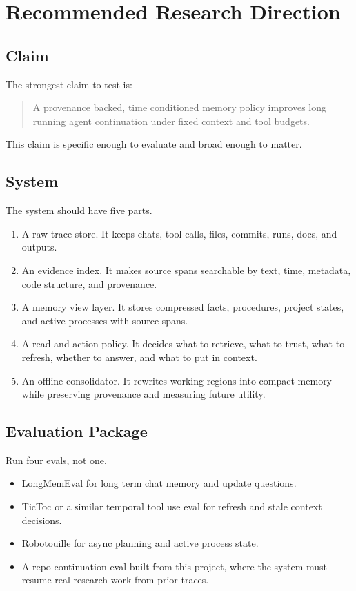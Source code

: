 \documentclass[11pt]{article}
\begin{document}
\section{Recommended Research Direction}

\subsection{Claim}

The strongest claim to test is:

\begin{quote}
A provenance backed, time conditioned memory policy improves long running agent continuation under fixed context and tool budgets.
\end{quote}

This claim is specific enough to evaluate and broad enough to matter.

\subsection{System}

The system should have five parts.

\begin{enumerate}
  \item A raw trace store. It keeps chats, tool calls, files, commits, runs, docs, and outputs.
  \item An evidence index. It makes source spans searchable by text, time, metadata, code structure, and provenance.
  \item A memory view layer. It stores compressed facts, procedures, project states, and active processes with source spans.
  \item A read and action policy. It decides what to retrieve, what to trust, what to refresh, whether to answer, and what to put in context.
  \item An offline consolidator. It rewrites working regions into compact memory while preserving provenance and measuring future utility.
\end{enumerate}

\subsection{Evaluation Package}

Run four evals, not one.

\begin{itemize}
  \item LongMemEval for long term chat memory and update questions.
  \item TicToc or a similar temporal tool use eval for refresh and stale context decisions.
  \item Robotouille for async planning and active process state.
  \item A repo continuation eval built from this project, where the system must resume real research work from prior traces.
\end{itemize}
\end{document}
